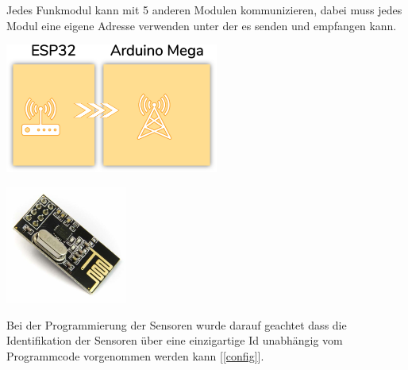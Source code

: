 \documentclass[
  12pt, %
  a4paper, %
  twoside, %
  openany, %
  numbers=noenddot, %
  BCOR=5mm, %
  parskip=half*, %
  thesis, %
]{bfhbook}
\newcommand{\compImgSize}{4cm}
\begin{document}
 Jedes Funkmodul kann mit 5 anderen Modulen kommunizieren, dabei muss jedes Modul eine eigene Adresse verwenden unter der es senden und empfangen kann.
\begin{center}
    \begin{minipage}[b]{0.45\textwidth}
        \centering
        \includegraphics[width=7cm]{Bilder/ESP32-Arduino.png} %
        \captionsetup{justification=centering}
    \end{minipage}\hfill
    \begin{minipage}[b]{0.45\textwidth}\label{nrf24}
        \centering
        \includegraphics[width=\compImgSize]{Bilder/NRF24.jpg} %
        \captionsetup{justification=centering}
    \end{minipage}
\end{center}
Bei der Programmierung der Sensoren wurde darauf geachtet dass die Identifikation der Sensoren über eine einzigartige Id unabhängig vom Programmcode vorgenommen werden kann [\ref{config}].
\end{document}
